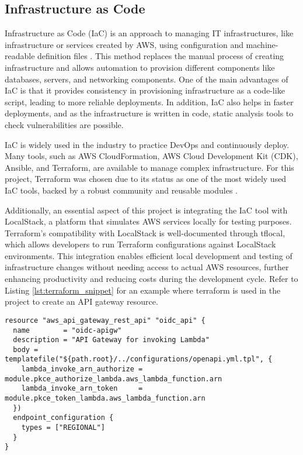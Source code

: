 \subsection{Infrastructure as Code}
Infrastructure as Code (IaC) is an approach to managing IT infrastructures, like infrastructure or services created by AWS, using configuration and machine-readable definition files \citep{iac}. This method replaces the manual process of creating infrastructure and allows automation to provision different components like databases, servers, and networking components. One of the main advantages of IaC is that it provides consistency in provisioning infrastructure as a code-like script, leading to more reliable deployments. In addition, IaC also helps in faster deployments, and as the infrastructure is written in code, static analysis tools to check vulnerabilities are possible.

IaC is widely used in the industry to practice DevOps and continuously deploy. Many tools, such as AWS CloudFormation, AWS Cloud Development Kit (CDK), Ansible, and Terraform, are available to manage complex infrastructure. For this project, Terraform was chosen due to its status as one of the most widely used IaC tools, backed by a robust community and reusable modules \citep{terraform}.

Additionally, an essential aspect of this project is integrating the IaC tool with LocalStack, a platform that simulates AWS services locally for testing purposes. Terraform's compatibility with LocalStack is well-documented through tflocal, which allows developers to run Terraform configurations against LocalStack environments. This integration enables efficient local development and testing of infrastructure changes without needing access to actual AWS resources, further enhancing productivity and reducing costs during the development cycle. Refer to Listing \ref{lst:terraform_snippet} for an example where terraform is used in the project to create an API gateway resource.

\begin{lstlisting}[caption={Terraform Code Snippet for API Gateway}, label={lst:terraform_snippet}]
resource "aws_api_gateway_rest_api" "oidc_api" {
  name        = "oidc-apigw"
  description = "API Gateway for invoking Lambda"
  body = templatefile("${path.root}/../configurations/openapi.yml.tpl", {
    lambda_invoke_arn_authorize = module.pkce_authorize_lambda.aws_lambda_function.arn
    lambda_invoke_arn_token     = module.pkce_token_lambda.aws_lambda_function.arn
  })
  endpoint_configuration {
    types = ["REGIONAL"]
  }
}
\end{lstlisting}